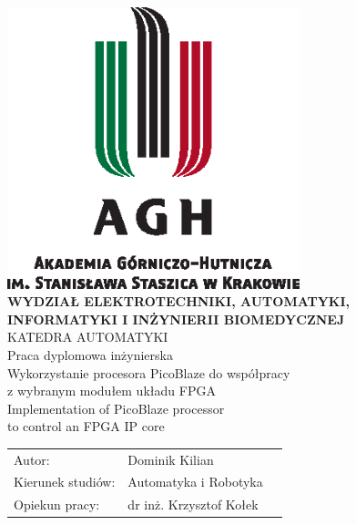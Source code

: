 
\begin{center}
\includegraphics[width=8.5cm]{obrazki/agh_nzw_s_pl_2w_wbr_cmyk.eps}\\[7mm]
\textbf{WYDZIAŁ ELEKTROTECHNIKI, AUTOMATYKI,\\
INFORMATYKI I INŻYNIERII BIOMEDYCZNEJ}\\[5mm]
KATEDRA AUTOMATYKI \\[8mm]
\Large{Praca dyplomowa inżynierska} \\[8mm]
\Large{Wykorzystanie procesora PicoBlaze do współpracy\\
	z wybranym modułem układu FPGA}\\[8mm]
\Large{Implementation of PicoBlaze processor\\
	to control an FPGA IP core}\\[12mm]
\end{center}


\begin{tabular}{lll}
	Autor: & Dominik Kilian \\
	Kierunek studiów: & Automatyka i Robotyka \\
	Opiekun pracy: & dr inż. Krzysztof Kołek
\end{tabular}

\czystastopka
{}

\pagebreak

